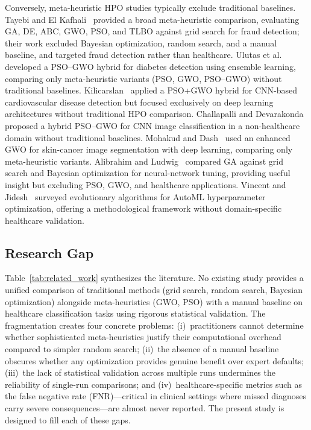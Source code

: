 \documentclass[letterpaper, 10 pt, conference]{ieeeconf}
\begin{document}
Conversely, meta-heuristic HPO studies typically exclude traditional baselines. Tayebi and El Kafhali~\cite{tayebi2022} provided a broad meta-heuristic comparison, evaluating GA, DE, ABC, GWO, PSO, and TLBO against grid search for fraud detection; their work excluded Bayesian optimization, random search, and a manual baseline, and targeted fraud detection rather than healthcare. Ulutas et al.~\cite{ulutas2024} developed a PSO--GWO hybrid for diabetes detection using ensemble learning, comparing only meta-heuristic variants (PSO, GWO, PSO--GWO) without traditional baselines. Kilicarslan~\cite{kilicarslan2023} applied a PSO+GWO hybrid for CNN-based cardiovascular disease detection but focused exclusively on deep learning architectures without traditional HPO comparison. Challapalli and Devarakonda~\cite{challapalli2022} proposed a hybrid PSO--GWO for CNN image classification in a non-healthcare domain without traditional baselines. Mohakud and Dash~\cite{mohakud2022} used an enhanced GWO for skin-cancer image segmentation with deep learning, comparing only meta-heuristic variants. Alibrahim and Ludwig~\cite{alibrahim2021} compared GA against grid search and Bayesian optimization for neural-network tuning, providing useful insight but excluding PSO, GWO, and healthcare applications. Vincent and Jidesh~\cite{vincent2023} surveyed evolutionary algorithms for AutoML hyperparameter optimization, offering a methodological framework without domain-specific healthcare validation.

\subsection{Research Gap}

Table~\ref{tab:related_work} synthesizes the literature. No existing study provides a unified comparison of traditional methods (grid search, random search, Bayesian optimization) alongside meta-heuristics (GWO, PSO) with a manual baseline on healthcare classification tasks using rigorous statistical validation. The fragmentation creates four concrete problems: (i)~practitioners cannot determine whether sophisticated meta-heuristics justify their computational overhead compared to simpler random search; (ii)~the absence of a manual baseline obscures whether any optimization provides genuine benefit over expert defaults; (iii)~the lack of statistical validation across multiple runs undermines the reliability of single-run comparisons; and (iv)~healthcare-specific metrics such as the false negative rate (FNR)---critical in clinical settings where missed diagnoses carry severe consequences---are almost never reported. The present study is designed to fill each of these gaps.
\end{document}
